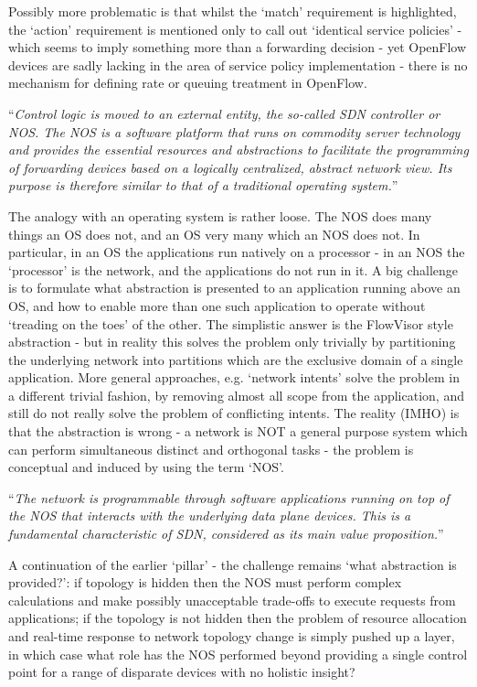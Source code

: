 Possibly more problematic is that whilst the ‘match’ requirement is highlighted, the ‘action’ requirement is mentioned only to call out ‘identical service policies’ - which seems to imply something more than a forwarding decision - yet OpenFlow devices are sadly lacking in the area of service policy implementation - there is no mechanism for defining rate or queuing treatment in OpenFlow.

“\textit{Control logic is moved to an external entity, the so-called SDN controller or NOS. The NOS is a software platform that runs on commodity server technology and provides the essential resources and abstractions to facilitate the programming of forwarding devices based on a logically centralized, abstract network view. Its purpose is therefore similar to that of a traditional operating system.}”

The analogy with an operating system is rather loose.
The NOS does many things an OS does not, and an OS very many which an NOS does not.
In particular, in an OS the applications run natively on a processor - in an NOS the ‘processor’ is the network, and the applications do not run in it.
A big challenge is to formulate what abstraction is presented to an application running above an OS, and how to enable more than one such application to operate without ‘treading on the toes’ of the other.
The simplistic answer is the FlowVisor style abstraction - but in reality this solves the problem only trivially by partitioning the underlying network into partitions which are the exclusive domain of a single application.
More general approaches, e.g. ‘network intents’ solve the problem in a different trivial fashion, by removing almost all scope from the application, and still do not really solve the problem of conflicting intents.
The reality (IMHO) is that the abstraction is wrong - a network is NOT a general purpose system which can perform simultaneous distinct and orthogonal tasks - the problem is conceptual and induced by using the term ‘NOS’.

“\textit{The network is programmable through software applications running on top of the NOS that interacts with the underlying data plane devices.
	This is a fundamental characteristic of SDN, considered as its main value proposition.}”

A continuation of the earlier ‘pillar’ - the challenge remains ‘what abstraction is provided?’: if topology is hidden then the NOS must perform complex calculations and make possibly unacceptable trade-offs to execute requests from applications; if the topology is not hidden then the problem of resource allocation and real-time response to network topology change is simply pushed up a layer, in which case what role has the NOS performed beyond providing a single control point for a range of disparate devices with no holistic insight?

